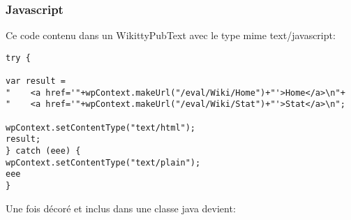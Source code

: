 \subsubsection*{Javascript}



Ce code contenu dans un WikittyPubText avec le type mime text/javascript:

\begin{lstlisting}
try {

var result =
"    <a href='"+wpContext.makeUrl("/eval/Wiki/Home")+"'>Home</a>\n"+
"    <a href='"+wpContext.makeUrl("/eval/Wiki/Stat")+"'>Stat</a>\n";

wpContext.setContentType("text/html");
result;
} catch (eee) {
wpContext.setContentType("text/plain");
eee
}
\end{lstlisting}


Une fois décoré et inclus dans une classe java devient: 

